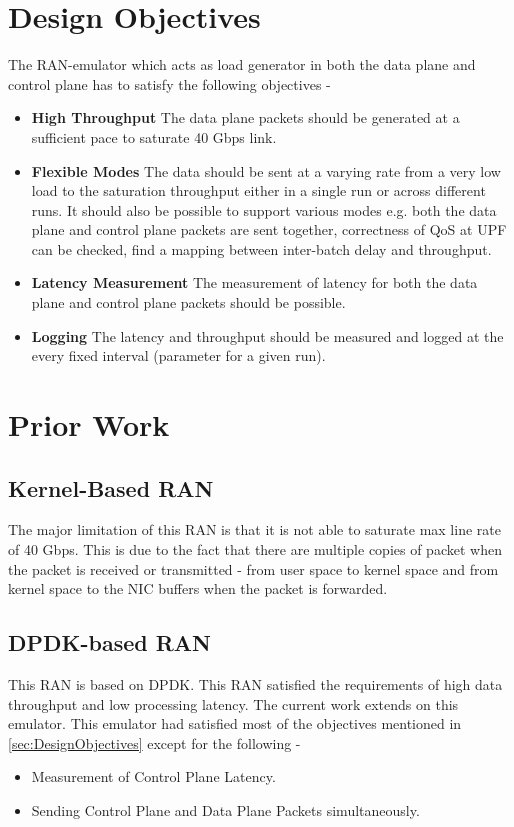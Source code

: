 \section{Design Objectives \label{sec:DesignObjectives}}
The RAN-emulator which acts as load generator in both the data plane and control plane
has to satisfy the following objectives -
\begin{itemize}
	\item \textbf{High Throughput} The data plane packets should be generated at
	      a sufficient pace to saturate 40 Gbps link.
	\item \textbf{Flexible Modes} The data should be sent at a varying rate from a very low
	      load to the saturation throughput either in a single run or across different runs.
	      It should also be possible to support various modes e.g. both the data plane and control plane packets are sent together, correctness of QoS at
	      UPF can be checked, find a mapping between inter-batch delay and throughput.
	\item \textbf{Latency Measurement} The measurement of latency for both the data plane and
	      control plane packets should be possible.
	\item \textbf{Logging} The latency and throughput should be measured and logged at the
	      every fixed interval (parameter for a given run).
\end{itemize}

\section{Prior Work}
\subsection{Kernel-Based RAN}
The major limitation of this RAN is that it is not able to saturate max line rate of 40 Gbps. This is due to the fact that there are multiple copies of packet when the packet is received or transmitted - from user space to kernel space and from kernel space to the NIC buffers when the packet is forwarded.

\subsection{DPDK-based RAN}
This RAN is based on DPDK. This RAN satisfied the requirements of high data throughput and low processing latency. The current work extends on this emulator.
This emulator had satisfied most of the objectives mentioned in \ref{sec:DesignObjectives} except for the following -
\begin{itemize}
	\item Measurement of Control Plane Latency.
	\item Sending Control Plane and Data Plane Packets simultaneously.
\end{itemize}


